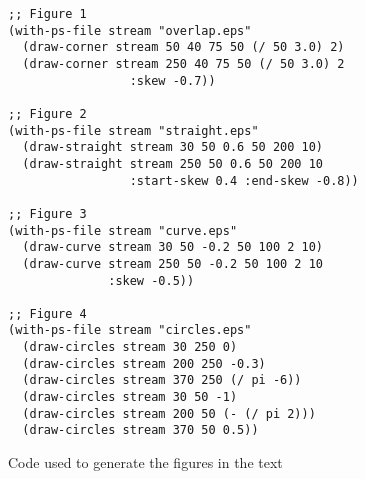 \documentclass{article}
\begin{document}
\begin{figure}
  \centering
\begin{verbatim}
;; Figure 1
(with-ps-file stream "overlap.eps"
  (draw-corner stream 50 40 75 50 (/ 50 3.0) 2)
  (draw-corner stream 250 40 75 50 (/ 50 3.0) 2
                 :skew -0.7))

;; Figure 2
(with-ps-file stream "straight.eps"
  (draw-straight stream 30 50 0.6 50 200 10)
  (draw-straight stream 250 50 0.6 50 200 10 
                 :start-skew 0.4 :end-skew -0.8))

;; Figure 3
(with-ps-file stream "curve.eps"
  (draw-curve stream 30 50 -0.2 50 100 2 10)
  (draw-curve stream 250 50 -0.2 50 100 2 10
              :skew -0.5))

;; Figure 4
(with-ps-file stream "circles.eps"
  (draw-circles stream 30 250 0)
  (draw-circles stream 200 250 -0.3)
  (draw-circles stream 370 250 (/ pi -6))
  (draw-circles stream 30 50 -1)
  (draw-circles stream 200 50 (- (/ pi 2)))
  (draw-circles stream 370 50 0.5))
\end{verbatim}
\caption{Code used to generate the figures in the text}
\end{figure}
\end{document}
